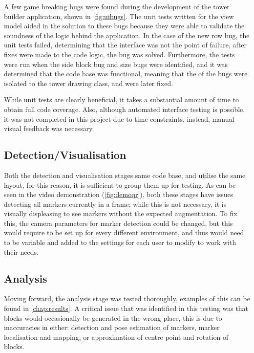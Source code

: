 A few game breaking bugs were found during the development of the tower builder application, shown in \cref{fig:uibugs}. The unit tests written for the view model aided in the solution to these bugs because they were able to validate the soundness of the logic behind the application. In the case of the new row bug, the unit tests failed, determining that the interface was not the point of failure, after fixes were made to the code logic, the bug was solved. Furthermore, the tests were run when the side block bug and size bugs were identified, and it was determined that the code base was functional, meaning that the of the bugs were isolated to the tower drawing class, and were later fixed.

While unit tests are clearly beneficial, it takes a substantial amount of time to obtain full code coverage. Also, although automated interface testing is possible, it was not completed in this project due to time constraints, instead, manual visual feedback was necessary.

\subsection{Detection/Visualisation}\label{det}

Both the detection and visualisation stages same code base, and utilise the same layout, for this reason, it is sufficient to group them up for testing. As can be seen in the video demonstration (\cref{fig:demoqr}), both these stages have issues detecting all markers currently in a frame; while this is not necessary, it is visually displeasing to see markers without the expected augmentation. To fix this, the camera parameters for marker detection could be changed, but this would require to be set up for every different environment, and thus would need to be variable and added to the settings for each user to modify to work with their needs.

\subsection{Analysis}\label{blockapproximation}

Moving forward, the analysis stage was tested thoroughly, examples of this can be found in \cref{chap:results}. A critical issue that was identified in this testing was that blocks would occasionally be generated in the wrong place, this is due to inaccuracies in either: detection and pose estimation of markers, marker localisation and mapping, or approximation of centre point and rotation of blocks.

